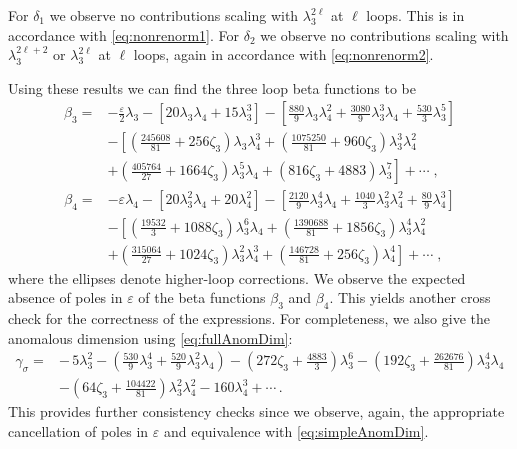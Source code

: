 \documentclass[a4paper,11pt]{article}
\begin{document}
For $\delta_1$ we observe no contributions scaling with $\lambda_3^{2\ell}$ at $\ell$ loops. This is in accordance with \cref{eq:nonrenorm1}. For $\delta_2$ we observe no contributions scaling with $\lambda_3^{2\ell+2}$ or  $\lambda_3^{2\ell}$ at $\ell$ loops, again in accordance with \cref{eq:nonrenorm2}. 

Using these results we can find the three loop beta functions to be 
\begin{align}\label{eq:Beta3ThreeLoops}
    \beta_3 =& -\frac{\varepsilon}{2}\lambda_3 - \left[ 20\lambda_3 \lambda_4 + 15\lambda_3^3 \right]  - \left [ \frac{880}{9}\lambda_3\lambda_4^2+ \frac{3080}{9}\lambda_3^3\lambda_4  + \frac{530}{3}\lambda_3^5 \right] \nonumber\\
    & - \left[ \left(  \frac{245608}{81} + 256\zeta_3\right)\lambda_3\lambda_4^3 + \left(  \frac{1075250}{81} + 960\zeta_3\right)\lambda_3^3\lambda_4^2 \right.\nonumber \\
    &\left.+ \left(  \frac{405764}{27} + 1664\zeta_3\right)\lambda_3^5\lambda_4  + \left( 816\zeta_3 + 4883\right)\lambda_3^7  \right] + \cdots \;,
\end{align}
\begin{align}
\label{eq:Beta4Threeloops}
    \beta_4 =& -\varepsilon \lambda_4 - \left[20\lambda_3^2 \lambda_4 + 20\lambda_4^2 \right] - \left[  \frac{2120}{9}\lambda_3^4\lambda_4  + \frac{1040}{3}\lambda_3^2\lambda_4^2 + \frac{80}{9}\lambda_4^3 \right]\nonumber  \\
   & -\left[  \left( \frac{19532}{3} + 1088\zeta_3\right)\lambda_3^6\lambda_4  + \left( \frac{1390688}{81} + 1856 \zeta_3 \right)\lambda_3^4\lambda_4^2      \right. \nonumber \\
   &\left.+ \left( \frac{315064}{27} + 1024\zeta_3\right)\lambda_3^2\lambda_4^3 + \left(\frac{146728}{81} + 256\zeta_3 \right) \lambda_4^4 \right] + \cdots  \;,
\end{align}
where the ellipses denote higher-loop corrections. We observe the expected absence of poles in $\varepsilon$ of the beta functions $\beta_3$ and $\beta_4$. This yields another cross check for the correctness of the expressions. For completeness, we also give the anomalous dimension using \cref{eq:fullAnomDim}: 
\begin{align}
    \gamma_{\sigma} =& -\,5\lambda_3^2 - \left(\frac{530}9\lambda_3^4 + \frac{520}{9}\lambda_3^2\lambda_4\right) - \left( 272\zeta_3 + \frac{4883}{3} \right)\lambda_3^6  - \left( 192\zeta_3 + \frac{262676}{81}\right)\lambda_3^4\lambda_4 \nonumber \\
    & - \left( 64\zeta_3 + \frac{104422}{81} \right) \lambda_3^2\lambda_4^2 - 160\lambda_4^3 + \cdots \,.
\end{align}
This provides further consistency checks since we observe, again, the appropriate cancellation of  poles in $\varepsilon$ and equivalence with \cref{eq:simpleAnomDim}.
\end{document}
